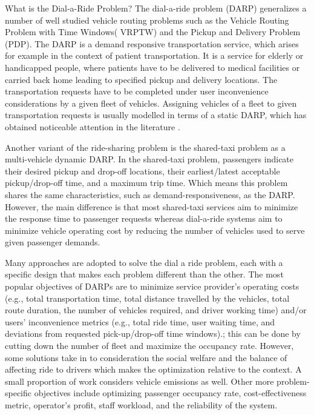 \documentclass{article}
\begin{document}
What is the Dial-a-Ride Problem? The dial-a-ride problem (DARP) generalizes a number of well studied vehicle routing problems such as the Vehicle Routing Problem with Time Windows(
VRPTW) and the Pickup and Delivery Problem (PDP). The DARP is a demand responsive transportation service, which arises for example in the context of patient transportation.
It is a service for elderly or handicapped people, where patients have to be delivered to medical facilities or carried back home leading to specified pickup and delivery locations. The transportation requests have to be completed under
user inconvenience considerations by a given fleet of vehicles. Assigning vehicles of a fleet to given transportation requests is usually modelled in terms of a static DARP, which has obtained noticeable attention in the literature \cite{Ritzinger_Puchinger2016}.

Another variant of the ride-sharing problem is the shared-taxi problem as a multi-vehicle dynamic DARP. In the shared-taxi problem, passengers indicate their desired pickup and
drop-off locations, their earliest/latest acceptable pickup/drop-off time, and a maximum trip time. Which means this problem shares the same characteristics, such as demand-responsiveness, as the DARP. 
However, the main difference is that most shared-taxi services aim to minimize the response time to passenger requests whereas dial-a-ride systems aim to minimize vehicle operating cost by reducing
the number of vehicles used to serve given passenger demands.

Many approaches are adopted to solve the dial a ride problem, each with a specific design that makes each problem different than the other. The most popular objectives of DARPs are to minimize service provider’s operating costs (e.g., total transportation time, total distance travelled by the vehicles, total route duration, the number of vehicles required, and driver working time) and/or users’ inconvenience metrics (e.g., total ride time, user waiting time, and deviations from requested pick-up/drop-off time windows).; this can be done by cutting down the number of fleet and maximize the occupancy rate. However, some solutions take in to consideration the social welfare and the balance of affecting ride to drivers which makes the optimization relative to the context. A small proportion of work considers vehicle emissions as well. Other more problem-specific objectives include optimizing passenger occupancy rate, cost-effectiveness metric, operator’s profit, staff workload, and the reliability of the system.
\end{document}
